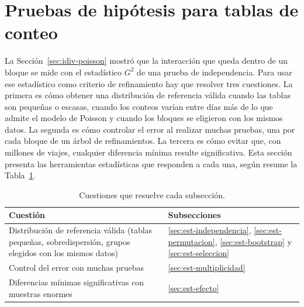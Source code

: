 
\section{Pruebas de hipótesis para tablas de conteo}\label{sec:pruebas}

La Sección~\ref{sec:idiv-poisson} mostró que la interacción que queda dentro de un
bloque se mide con el estadístico $G^2$ de una prueba de independencia. Para usar
ese estadístico como criterio de refinamiento hay que resolver tres cuestiones. La
primera es cómo obtener una distribución de referencia válida cuando las tablas
son pequeñas o escasas, cuando los conteos varían entre días más de lo que
admite el modelo de Poisson y cuando los bloques se eligieron con los mismos
datos. La
segunda es cómo controlar el error al realizar muchas pruebas, una por cada bloque
de un árbol de refinamientos. La tercera es cómo evitar que, con millones de
viajes, cualquier diferencia mínima resulte significativa. Esta sección presenta
las herramientas estadísticas que responden a cada una, según resume la
Tabla~\ref{tab:pruebas-mapa}.

\begin{table}[ht]
  \centering
  {\footnotesize
  \renewcommand{\arraystretch}{1.4}
  \begin{tabular}{@{}>{\raggedright\arraybackslash}p{}
                  >{\raggedright\arraybackslash}p{}@{}}
    \toprule
    \textbf{Cuestión} & \textbf{Subsecciones} \\
    \midrule
    Distribución de referencia válida (tablas pequeñas, sobredispersión,
      grupos elegidos con los mismos datos) &
      \ref{sec:est-independencia}, \ref{sec:est-permutacion},
      \ref{sec:est-bootstrap} y \ref{sec:est-seleccion} \\
    \midrule
    Control del error con muchas pruebas &
      \ref{sec:est-multiplicidad} \\
    \midrule
    Diferencias mínimas significativas con muestras enormes &
      \ref{sec:est-efecto} \\
    \bottomrule
  \end{tabular}
  }
  \caption{Cuestiones que resuelve cada subsección.}
  \label{tab:pruebas-mapa}
\end{table}

